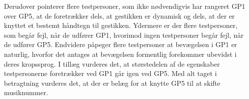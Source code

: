 Derudover pointerer flere testpersoner, som ikke nødvendigvis har rangeret GP1 over GP5, at de foretrækker dels, at gestikken er dynamisk og dels, at der er knyttet et bestemt håndtegn til gestikken. Ydermere er der flere testpersoner, som begår fejl, når de udfører GP1, hvorimod ingen testpersoner begår fejl, når de udfører GP5. Endvidere påpeger flere testpersoner at bevægelsen i GP1 er naturlig, hvorfor det antages at bevægelsen formentlig forekommer ubevidst i deres kropssprog. I tillæg vurderes det, at størstedelen af de egenskaber testpersonerne foretrækker ved GP1 går igen ved GP5. Med alt taget i betragtning vurderes det, at der er belæg for at knytte GP5 til at skifte musiknummer.

